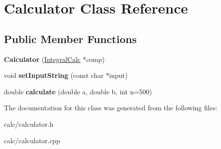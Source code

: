 \hypertarget{class_calculator}{}\section{Calculator Class Reference}
\label{class_calculator}
\subsection*{Public Member Functions}
\begin{DoxyCompactItemize}
\item 
\hypertarget{class_calculator_a0894c21f33144bd7bc2d888b3fde5058}{}\label{class_calculator_a0894c21f33144bd7bc2d888b3fde5058} 
{\bfseries Calculator} (\hyperlink{class_integral_calc}{Integral\+Calc} $\ast$comp)
\item 
\hypertarget{class_calculator_ad39d412cc01a3d3d60ffefa6de7db367}{}\label{class_calculator_ad39d412cc01a3d3d60ffefa6de7db367} 
void {\bfseries set\+Input\+String} (const char $\ast$input)
\item 
\hypertarget{class_calculator_a5838d810f9cad7aa02ab65db583facc1}{}\label{class_calculator_a5838d810f9cad7aa02ab65db583facc1} 
double {\bfseries calculate} (double a, double b, int n=500)
\end{DoxyCompactItemize}


The documentation for this class was generated from the following files\+:\begin{DoxyCompactItemize}
\item 
calc/calculator.\+h\item 
calc/calculator.\+cpp\end{DoxyCompactItemize}
